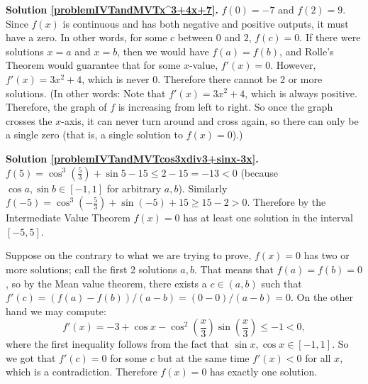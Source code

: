 \textbf{Solution \ref{problemIVTandMVTx^3+4x+7}.}  $f(0) = -7$ and $f(2) = 9$. Since $f(x)$ is continuous and has both negative and positive outputs, it must have a zero. In other words, for some $c$ between $0$ and $2$, $f(c) = 0$. If there were solutions $x = a$ and $x = b$,  then we would have $f(a) = f(b)$, and Rolle's Theorem would guarantee that for some $x$-value, $f'(x) = 0$. However, $f'(x) = 3x^2 + 4$, which is never 0. Therefore there cannot be 2 or more solutions. 
(In other words: Note that $f'(x) = 3x^2 + 4$, which is always positive. Therefore, the graph of $f$ is increasing from left to right. So once the graph crosses the $x$-axis, it can never turn around and cross again, so there can only be a single zero (that is, a single solution to $f(x) = 0$).)


\textbf{Solution \ref{problemIVTandMVTcos3xdiv3+sinx-3x}.} $f(5)= \cos^3 \left(\frac{5}{3}\right) +\sin 5-15 \leq 2-15=-13<0 $ (because $\cos a, \sin b\in [-1,1]$ for arbitrary $a,b$). Similarly $f(-5)=\cos^3\left(-\frac{5}{3}\right) +\sin (-5)+15 \geq 15-2>0$. Therefore by the Intermediate Value Theorem $f(x)=0$ has at least one solution in the interval $[-5,5]$.

Suppose on the contrary to what we are trying to prove, $f(x)=0$ has two or more solutions; call the first 2 solutions $a,b$. That means that $f(a)=f(b)=0$, so by the Mean value theorem, there exists a $c\in (a,b)$ such that $f'(c)=(f(a)-f(b))/(a-b)=(0-0)/(a-b)=0$. On the other hand we may compute:
\[ 
f'(x)=-3+\cos x-\cos^{2}\left(\frac{x}3\right)\sin\left(\frac{x}{3}\right) \leq -1<0,
\] 
where the first inequality follows from the fact that $\sin x,\cos x\in [-1,1]$. So we got that $f'(c)=0$ for some $c$ but at the same time $f'(x)<0$ for all $x$, which is a contradiction. Therefore $f(x)=0$ has exactly one solution. 